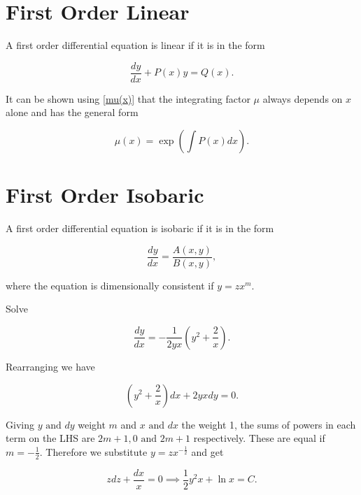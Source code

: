 \documentclass[english,a4paper,12pt]{report}
\begin{document}
\section{First Order Linear}

A first order differential equation is linear if it is in the form

\begin{equation}
    \frac{dy}{dx} + P(x)y = Q(x). 
\end{equation}

It can be shown using \cref{mu(x)} that the integrating factor \(\mu \) always depends on \(x\) alone and has the general form

\begin{equation}
    \mu (x) = \exp \left( \int P(x) dx \right).
\end{equation}

\section{First Order Isobaric}

A first order differential equation is isobaric if it is in the form

\begin{equation}
    \frac{dy}{dx} = \frac{A(x,y)}{B(x,y)},  
\end{equation}

where the equation is dimensionally consistent if \(y = zx^{m} \). 

{Solve

\begin{equation}
    \frac{dy}{dx} = -\frac{1}{2yx}(y^2 + \frac{2}{x} ).  
\end{equation}
}
{Rearranging we have 

\begin{equation}
    \left( y^2 + \frac{2}{x}  \right) dx + 2yxdy = 0.
\end{equation}

Giving \(y\text { and } dy\) weight \(m\) and \(x\text { and } dx\) the weight 1, the sums of powers in each term on the LHS are \(2m+1,0 \text { and } 2m+1\) respectively. These are equal if \(m = -\frac{1}{2} \). Therefore we substitute \(y = zx^{-\frac{1}{2} } \) and get

\begin{equation}
    zdz + \frac{dx}{x} = 0 \implies \frac{1}{2}y^2x + \ln x = C. 
\end{equation}
} 
\end{document}
